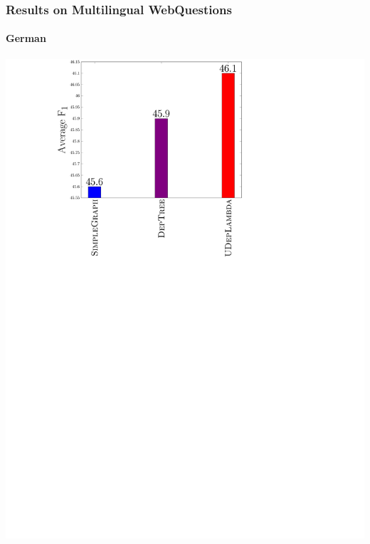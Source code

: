 \documentclass[mathserif,12pt]{beamer}
\begin{document}
\begin{frame}
\frametitle{Results on Multilingual WebQuestions}
\framesubtitle{German}
\centering
\large
\vspace{0.4em}
\includegraphics[trim=9.5em 0em 23em 1em,clip=true,scale=0.5]{figures/deplambda_results_plot_ud-de}
\end{frame}
\end{document}
